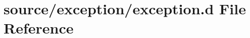\hypertarget{exception_8d}{\section{source/exception/exception.d File Reference}
\label{exception_8d}
}
